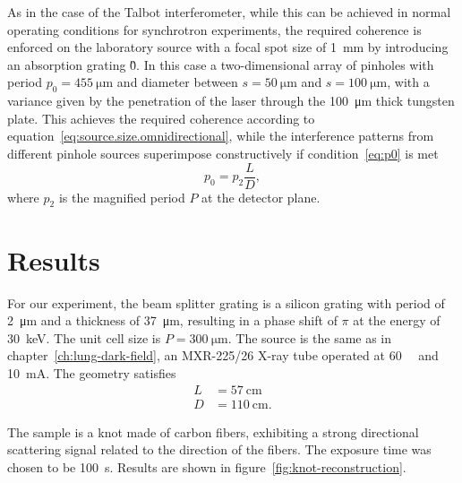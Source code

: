 As in the case of the Talbot interferometer, while this can be achieved in
normal operating conditions for synchrotron experiments, the required
coherence is enforced on the laboratory source with a focal spot size of
\SI{1}{\milli\meter} by introducing an absorption grating \G0. In this case
a two-dimensional array of pinholes with period $p_0 =
\SI{455}{\micro\meter}$ and diameter between $s = \SI{50}{\micro\meter}$ and
$ s = \SI{100}{\micro\meter}$, with a variance given by the penetration of
the laser through the \SI{100}{\micro\meter} thick tungsten
plate. This achieves the required coherence according to
equation~\eqref{eq:source.size.omnidirectional}, while the interference
patterns from different pinhole sources superimpose constructively if
condition~\eqref{eq:p0} is met
\begin{equation}
    p_0 = p_2 \frac{L}{D}\label{eq:p0.omnidirectional},
\end{equation}
where $p_2$ is the magnified period $P$ at the detector plane.

\section{Results}
For our experiment, the beam splitter grating is a silicon grating with
period of \SI{2}{\micro\meter} and a thickness of \SI{37}{\micro\meter},
resulting in a phase shift of $\pi$ at the energy of \SI{30}{\kilo\eV}. The
unit cell size is $P = \SI{300}{\micro\meter}$. The
source is the same as in chapter~\ref{ch:lung-dark-field}, an MXR-225/26
X-ray tube operated at \SI{60}{\kilo\voltpeak} and \SI{10}{\milli\ampere}.
The geometry satisfies
\begin{align*}
    L &= \SI{57}{\centi\meter}\\
    D &= \SI{110}{\centi\meter}.
\end{align*}

The sample is a knot made of carbon fibers, exhibiting a strong
directional scattering signal related to the direction of the fibers. The exposure
time was chosen to be \SI{100}{\second}.
Results are shown in figure~\ref{fig:knot-reconstruction}.

